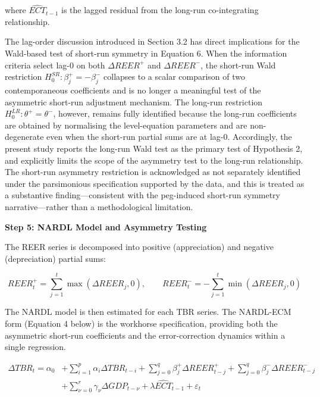 \documentclass[12pt]{article}
\begin{document}
where $\widehat{ECT}_{t-1}$ is the lagged residual from the long-run co-integrating relationship.

\vspace{0.3cm}
The lag-order discussion introduced in Section 3.2 has direct implications for the Wald-based test of short-run symmetry in Equation 6. When the information criteria select lag-0 on both $\Delta REER^{+}$ and $\Delta REER^{-}$, the short-run Wald restriction $H_0^{SR}: \beta_j^{+} = -\beta_j^{-}$ collapses to a scalar comparison of two contemporaneous coefficients and is no longer a meaningful test of the asymmetric short-run adjustment mechanism. The long-run restriction $H_0^{LR}: \theta^{+} = \theta^{-}$, however, remains fully identified because the long-run coefficients are obtained by normalising the level-equation parameters and are non-degenerate even when the short-run partial sums are at lag-0. Accordingly, the present study reports the long-run Wald test as the primary test of Hypothesis 2, and explicitly limits the scope of the asymmetry test to the long-run relationship. The short-run asymmetry restriction is acknowledged as not separately identified under the parsimonious specification supported by the data, and this is treated as a substantive finding---consistent with the peg-induced short-run symmetry narrative---rather than a methodological limitation.

\vspace{0.3cm}
\noindent\textbf{Step 5: NARDL Model and Asymmetry Testing}

The REER series is decomposed into positive (appreciation) and negative (depreciation) partial sums:

\[
REER_t^{+} = \sum_{j=1}^{t}\max(\Delta REER_j, 0), \qquad
REER_t^{-} = -\sum_{j=1}^{t}\min(\Delta REER_j, 0)
\tag{3}
\]

The NARDL model is then estimated for each TBR series. The NARDL-ECM form (Equation 4 below) is the workhorse specification, providing both the asymmetric short-run coefficients and the error-correction dynamics within a single regression.

\[
\begin{aligned}
\Delta TBR_t = \alpha_0 &+ \sum_{i=1}^{p}\alpha_i\Delta TBR_{t-i} + \sum_{j=0}^{q}\beta_j^{+}\Delta REER_{t-j}^{+} + \sum_{j=0}^{q}\beta_j^{-}\Delta REER_{t-j}^{-} \\
&+ \sum_{\nu=0}^{r}\gamma_\nu\Delta GDP_{t-\nu} + \lambda \widehat{ECT}_{t-1} + \varepsilon_t
\end{aligned}
\tag{4}
\]
\end{document}
